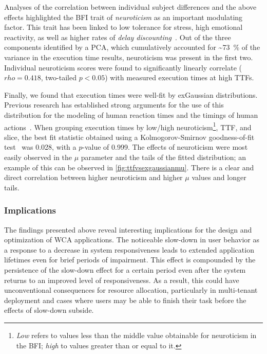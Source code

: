 Analyses of the correlation between individual subject differences and the above effects highlighted the \gls{BFI} trait of \emph{neuroticism} as an important modulating factor.
This trait has been linked to low tolerance for stress, high emotional reactivity, as well as higher rates of \emph{delay discounting}~\cite{hirsh2008delay}.
Out of the three components identified by a \gls{PCA}, which cumulatively accounted for \textasciitilde\SI{73}{\percent} of the variance in the execution time results, neuroticism was present in the first two.
Individual neuroticism scores were found to significantly linearly correlate (\ensuremath{rho = 0.418}, two-tailed \ensuremath{p < 0.05}) with measured execution times at high \glspl{TTF}.

Finally, we found that execution times were well-fit by \gls{exGaussian} distributions.
Previous research has established strong arguments for the use of this distribution for the modeling of human reaction times and the timings of human actions~\cite{rohrer1994analysis,palmer2011what,marmolejo_ramos2022generalised}.
When grouping execution times by low/high neuroticism\footnote{%
    \emph{Low} refers to values less than the middle value obtainable for neuroticism in the \gls{BFI}; \emph{high} to values greater than or equal to it.
}, \gls{TTF}, and slice, the best fit statistic obtained using a Kolmogorov-Smirnov goodness-of-fit test~\cite{massey_jr1951kolmogorov} was \num{0.028}, with a \ensuremath{p}-value of \num{0.999}.
The effects of neuroticism were most easily observed in the \ensuremath{\mu} parameter and the tails of the fitted distribution;
an example of this can be observed in \cref{fig:ttfvsexgaussianmu}.
There is a clear and direct correlation between higher neuroticism and higher \ensuremath{\mu} values and longer tails.

\subsubsection{Implications}

The findings presented above reveal interesting implications for the design and optimization of \gls{WCA} applications.
The noticeable slow-down in user behavior as a response to a decrease in system responsiveness leads to extended application lifetimes even for brief periods of impairment.
This effect is compounded by the persistence of the slow-down effect for a certain period even after the system returns to an improved level of responsiveness.
As a result, this could have unconventional consequences for resource allocation, particularly in multi-tenant deployment and cases where users may be able to finish their task before the effects of slow-down subside.

